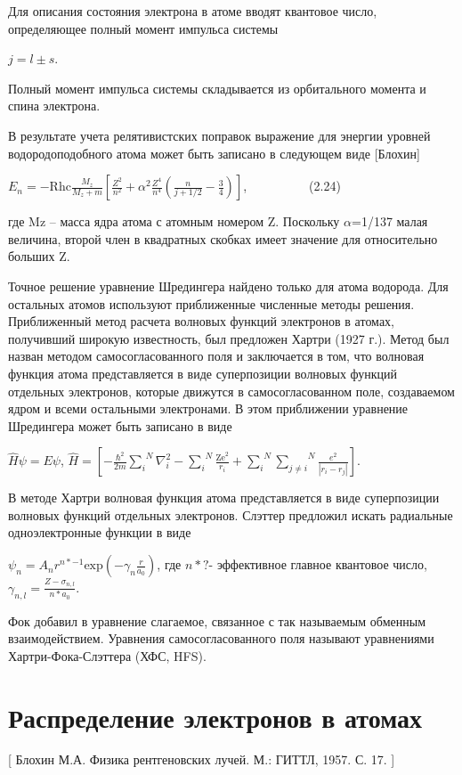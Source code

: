 \documentclass[a4paper,14pt, openany, twoside, draft]{extbook} %
\begin{document}
Для описания состояния электрона в атоме вводят квантовое число, определяющее полный момент импульса системы

 $j=l\pm s$.

Полный момент импульса системы складывается из орбитального момента и спина электрона.

В результате учета релятивистских поправок выражение для энергии уровней водородоподобного атома может быть записано в следующем виде [Блохин]

 $E_n=-{\text{Rhc}}\frac{M_z}{M_z+m}\left[\frac{Z^2}{n^2}+\alpha ^2\frac{Z^4}{n^4}\left(\frac n{j+1/2}-\frac 3 4\right)\right]$,\ \ \ \ \ \ \ \ \ \ (2.24)

где Mz – масса ядра атома с атомным номером Z. Поскольку ${\alpha}$=1/137 малая величина, второй член в квадратных скобках имеет значение для относительно больших Z.

Точное решение уравнение Шредингера найдено только для атома водорода. Для остальных атомов используют приближенные численные методы решения. Приближенный метод расчета волновых функций электронов в атомах, получивший широкую известность, был предложен Хартри (1927 г.). Метод был назван методом самосогласованного поля и заключается в том, что волновая функция атома представляется в виде суперпозиции волновых функций отдельных электронов, которые движутся в самосогласованном поле, создаваемом ядром и всеми остальными электронами. В этом приближении уравнение Шредингера может быть записано в виде

 $\hat H\psi =\mathit{E\psi }$,   $\hat H=\left[-\frac{\hbar ^2}{2m}\overset N{\underset i{\sum }}\nabla _i^2-\overset N{\underset i{\sum }}\frac{{\text{Ze}}^2}{r_i}+\overset N{\underset i{\sum }}\overset N{\underset{j\neq i}{\sum }}\frac{e^2}{|r_i-r_j|}\right]$.

В методе Хартри волновая функция атома представляется в виде суперпозиции волновых функций отдельных электронов. Слэттер предложил искать радиальные одноэлектронные функции в виде

 $\psi _n=A_nr^{n\ast -1}\text{exp}(-\gamma _n\frac r{a_0})$, где  $n\ast ?${}- эффективное главное квантовое число,  $\gamma _{n,l}=\frac{Z-\sigma _{n,l}}{n\ast a_0}$.

Фок добавил в уравнение слагаемое, связанное с так называемым обменным взаимодействием. Уравнения самосогласованного поля называют уравнениями Хартри-Фока-Слэттера (ХФС, HFS).

\section{Распределение электронов в атомах}
\label{sec:electron-in-athoms}
[ Блохин М.А. Физика рентгеновских лучей. М.: ГИТТЛ, 1957. С. 17. ]
\end{document}
